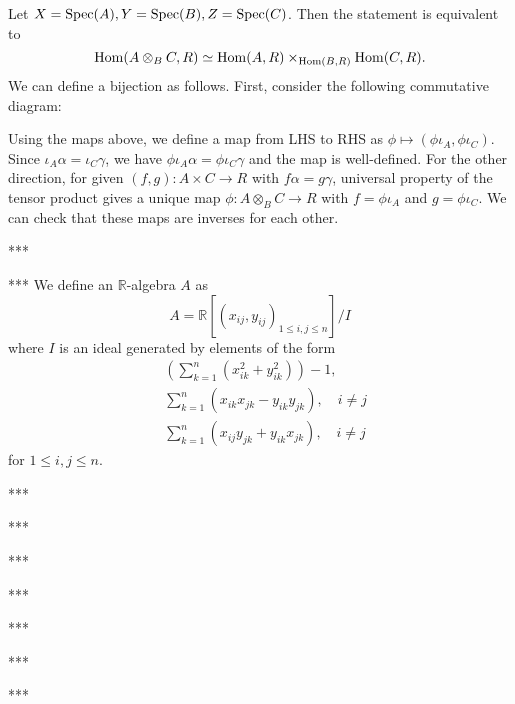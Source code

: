 \begin{problem}
Let $X = \operatorname{\mathrm{Spec}}(A), Y = \operatorname{\mathrm{Spec}}(B), Z = \operatorname{\mathrm{Spec}}(C)$. Then the statement is equivalent to
$$
    \operatorname{\mathrm{Hom}}(A \otimes_{B}C, R) \simeq \operatorname{\mathrm{Hom}}(A, R) \times_{\operatorname{\mathrm{Hom}}(B, R)} \operatorname{\mathrm{Hom}}(C, R).
$$
We can define a bijection as follows. First, consider the following commutative diagram:
\begin{center}
\end{center}
Using the maps above, we define a map from LHS to RHS as $\phi \mapsto (\phi \iota_{A}, \phi\iota_{C})$.
Since $\iota_{A}\alpha = \iota_{C}\gamma$, we have $\phi\iota_{A}\alpha = \phi\iota_{C}\gamma$ and the
map is well-defined.
For the other direction, for given $(f, g): A\times C \to R$ with $f\alpha = g \gamma$, universal property of the tensor product
gives a unique map $\phi: A\otimes_{B} C \to R$ with $f = \phi\iota_{A}$ and $g = \phi\iota_{C}$.
We can check that these maps are inverses for each other.
\end{problem}

\begin{problem} ***
\end{problem}

\begin{problem} ***
We define an $\mathbb{R}$-algebra $A$ as
$$
    A = \mathbb{R}[(x_{ij}, y_{ij})_{1 \leq i, j \leq n}] / I
$$
where $I$ is an ideal generated by elements of the form
\begin{align*}
    &\left(\sum_{k=1}^{n} (x_{ik}^{2} + y_{ik}^{2}) \right) - 1, \\
    &\sum_{k=1}^{n} (x_{ik}x_{jk} - y_{ik}y_{jk}), \quad i \neq j \\
    &\sum_{k=1}^{n} (x_{ij}y_{jk} + y_{ik}x_{jk}), \quad i \neq j
\end{align*}
for $1\leq i, j \leq n$.
\end{problem}
\begin{problem} ***
\end{problem}
\begin{problem} ***
\end{problem}
\begin{problem} ***
\end{problem}
\begin{problem} ***
\end{problem}
\begin{problem} ***
\end{problem}
\begin{problem} ***
\end{problem}
\begin{problem} ***
\end{problem}
